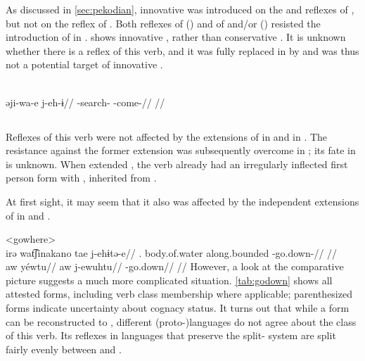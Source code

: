 As discussed in \cref{sec:pekodian}, innovative  was introduced on the \ikpeng and \bakairi reflexes of , but not on the \arara reflex of .
Both reflexes of  (\trio) and of  and/or  (\akuriyo) resisted the introduction of  in \PTir.
\carijo {} shows innovative , rather than conservative  .
It is unknown whether there is a \yukpa reflex of this verb, and it was fully replaced in \PWai by   and was thus not a potential target of innovative .

\carijo \parencite[][102]{guerrero2019carijo}\\
\begingl
\gla əji-wa-e j-eh-ɨ//
\glb {}-search- -come-//
\glft {}//
\endgl
\xe

\subsection{ }
\label{sec:godown}
Reflexes of this verb were not affected by the extensions of  in \PPek {} and  in \akuriyo {}.
The resistance against the former extension was subsequently overcome in \bakairi; its fate in \ikpeng is unknown.
When \akuriyo extended , the verb already had an irregularly inflected first person form with , inherited from \PTir.

At first sight, it may seem that it also was affected by the independent extensions of  in \carijo {} and \yukpa {}.

\pex<gowhere>
 \carijo {}\\
\begingl
\gla irə wat͡ʃinakano tae j-ehɨtə-e//
\glb {}. body.of.water along.bounded -go.down-//
\glft {}//
\endgl
{} \yukpa \parencite[][]{meira2003primeras}\\
\begingl
\glpreamble aw yéwtu//
\gla aw j-ewuhtu//
\glb {} -go.down//
\glft {}//
\endgl
\xe
%
However, a look at the comparative picture suggests a much more complicated situation.
\cref{tab:godown} shows all attested forms, including verb class membership where applicable; parenthesized forms indicate uncertainty about cognacy status.
It turns out that while a form  can be reconstructed to \PC, different (proto-)languages do not agree about the class of this verb.
Its reflexes in languages that preserve the split- system are split fairly evenly between  and .

